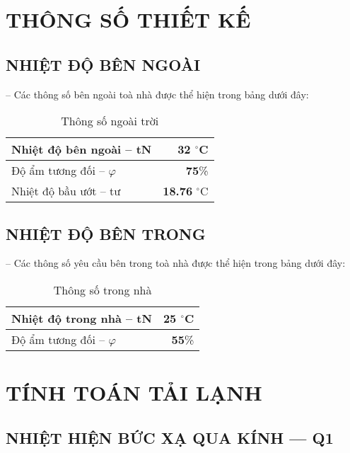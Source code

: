 
\section{THÔNG SỐ THIẾT KẾ}
\subsection{NHIỆT ĐỘ BÊN NGOÀI}
-- Các thông số bên ngoài toà nhà được thể hiện trong bảng dưới đây:
\begin{table}[H]
	\vspace{-0.3cm}
	\centering
	\caption{Thông số ngoài trời}
	\begin{tabular}{|l|r|}
		\hline
		Nhiệt độ bên ngoài -- t{\scriptsize N} & \textcolor[rgb]{ 1,  0,  0}{\textbf{32} $ ^{\circ} $C} \bigstrut\\
		\hline
		Độ ẩm tương đối -- $\varphi$ & \textcolor[rgb]{ 1,  0,  0}{\textbf{75}\%} \bigstrut\\
		\hline
		Nhiệt độ bầu ướt -- t{\scriptsize ư} & \textcolor[rgb]{ 1,  0,  0}{\textbf{18.76} $ ^{\circ} $C} \bigstrut\\
		\hline
	\end{tabular}
	\label{b:tsnt}
\end{table}

\subsection{NHIỆT ĐỘ BÊN TRONG}
-- Các thông số yêu cầu bên trong toà nhà được thể hiện trong bảng dưới đây:
\begin{table}[H]
	\vspace{-0.3cm}
	\centering
	\caption{Thông số trong nhà}
	\begin{tabular}{|l|r|}
		\hline
		Nhiệt độ trong nhà -- t{\scriptsize N} & \textcolor[rgb]{ 1,  0,  0}{\textbf{25} $ ^{\circ} $C} \bigstrut\\
		\hline
		Độ ẩm tương đối -- $\varphi$ & \textcolor[rgb]{ 1,  0,  0}{\textbf{55}\%} \bigstrut\\
		\hline
	\end{tabular}
	\label{b:tstn}
\end{table}

\section{TÍNH TOÁN TẢI LẠNH}
\subsection{NHIỆT HIỆN BỨC XẠ QUA KÍNH --- Q{\scriptsize 1}}
